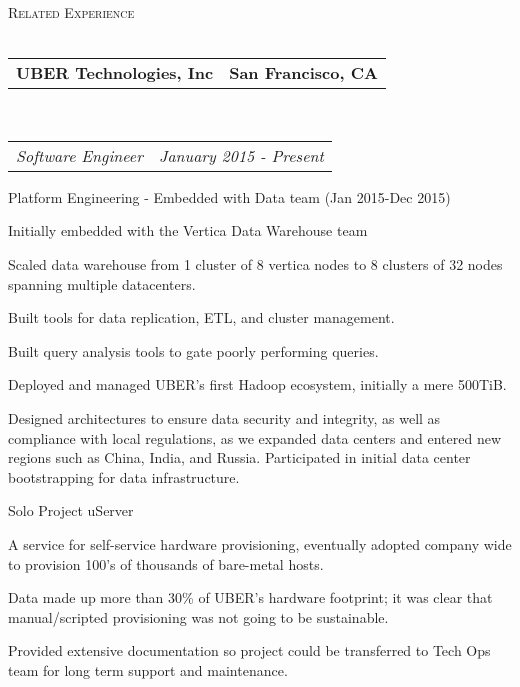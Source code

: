 \documentclass[10pt,letterpaper]{article}
\makeatletter
\newcommand{\lineunder}{\vspace*{-8pt} \\ \hspace*{-18pt} \hrulefill \\}
\newcommand{\header}[1]{{\hspace*{-15pt}\vspace*{6pt} \textsc{#1}} \vspace*{-6pt} \lineunder}
\newcommand{\headerrow}[2]
{\begin{tabular*}{\linewidth}{l@{\extracolsep{\fill}}r}
	#1 &
	#2 \\
\end{tabular*}}
\newcommand{\employment}[5]{
	\headerrow
		{\textbf{#1}}
		{\textbf{#2}}
	\\
	\headerrow
		{\emph{#3}}
		{\emph{#4}}
	\begin{itemize*}
		\item #5
	\end{itemize*}
}
\makeatother
\begin{document}
\header{Related Experience}
\employment{UBER Technologies, Inc}{San Francisco, CA}{Software Engineer}{January 2015 - Present}{
Platform Engineering - Embedded with Data team (Jan 2015-Dec 2015)
\begin{itemize*}
  \item Initially embedded with the Vertica Data Warehouse team
  \item Scaled data warehouse from 1 cluster of 8 vertica nodes to 8 clusters of 32 nodes spanning multiple datacenters.
  \item Built tools for data replication, ETL, and cluster management.
  \item Built query analysis tools to gate poorly performing queries.
  \item Deployed and managed UBER’s first Hadoop ecosystem, initially a mere 500TiB.
  \item Designed architectures to ensure data security and integrity, as well as compliance with local regulations, as we expanded data centers and entered new regions such as China, India, and Russia. Participated in initial data center bootstrapping for data infrastructure.
\item [Solo Project] uServer
  \item A service for self-service hardware provisioning, eventually adopted company wide to provision 100’s of thousands of bare-metal hosts.
  \item Data made up more than 30\% of UBER’s hardware footprint; it was clear that manual/scripted provisioning was not going to be sustainable.
  \item Provided extensive documentation so project could be transferred to Tech Ops team for long term support and maintenance.


\end{itemize*}}
\end{document}
